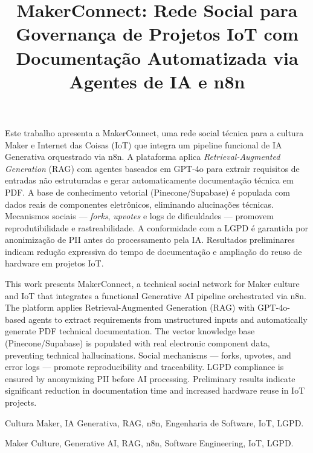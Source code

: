 \documentclass[portuguese]{sbcreviews-2025}%
\title[Rede Social Maker com Governança IoT e IA Generativa]{MakerConnect: Rede Social para Governança de Projetos IoT com Documentação Automatizada via Agentes de IA e n8n}
\author[Fróes 2026]{
\affil{\textbf{Vinícius Fróes}~\orcidlink{0000-0000-0000-0000}~\textcolor{blue}{\faEnvelope}~~[{Católica de Santa Catarina}~|\href{mailto:vinicius.froes@catolicasc.edu.br}{~{\textit{vinicius.froes@catolicasc.edu.br}}}~]}
}
\begin{document}
\begin{frontmatter}
\maketitle

\begin{abstract-pt}
Este trabalho apresenta a MakerConnect, uma rede social técnica para a cultura Maker e Internet das Coisas (IoT) que integra um pipeline funcional de IA Generativa orquestrado via n8n. A plataforma aplica \textit{Retrieval-Augmented Generation} (RAG) com agentes baseados em GPT-4o para extrair requisitos de entradas não estruturadas e gerar automaticamente documentação técnica em PDF. A base de conhecimento vetorial (Pinecone/Supabase) é populada com dados reais de componentes eletrônicos, eliminando alucinações técnicas. Mecanismos sociais — \textit{forks}, \textit{upvotes} e logs de dificuldades — promovem reprodutibilidade e rastreabilidade. A conformidade com a LGPD é garantida por anonimização de PII antes do processamento pela IA. Resultados preliminares indicam redução expressiva do tempo de documentação e ampliação do reuso de hardware em projetos IoT.
\end{abstract-pt}

\begin{abstract-en}
This work presents MakerConnect, a technical social network for Maker culture and IoT that integrates a functional Generative AI pipeline orchestrated via n8n. The platform applies Retrieval-Augmented Generation (RAG) with GPT-4o-based agents to extract requirements from unstructured inputs and automatically generate PDF technical documentation. The vector knowledge base (Pinecone/Supabase) is populated with real electronic component data, preventing technical hallucinations. Social mechanisms — forks, upvotes, and error logs — promote reproducibility and traceability. LGPD compliance is ensured by anonymizing PII before AI processing. Preliminary results indicate significant reduction in documentation time and increased hardware reuse in IoT projects.
\end{abstract-en}

\begin{pchaves}
Cultura Maker, IA Generativa, RAG, n8n, Engenharia de Software, IoT, LGPD.
\end{pchaves}
\begin{keywords}
Maker Culture, Generative AI, RAG, n8n, Software Engineering, IoT, LGPD.
\end{keywords}

\end{frontmatter}
\end{document}
